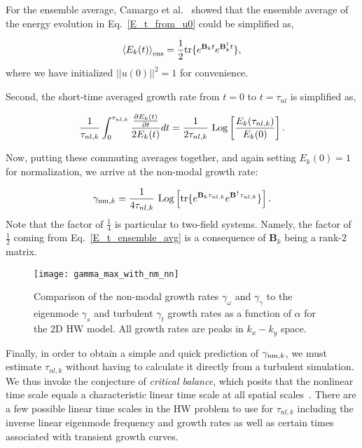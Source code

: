 \documentclass[twocolumn,showkeys,superscriptaddress]{revtex4}
\def\beq{\begin{equation}}
\def\eeq{\end{equation}}
\newcommand{\pdiff}[2]{\frac{\partial#1}{\partial#2}}
\begin{document}
For the ensemble average, Camargo et al.~\cite{camargo1998,friedman2014} showed that the ensemble average of the energy evolution in Eq.~\ref{E_t_from_u0} could be simplified as,

\beq
\label{E_t_ensemble_avg}
\left< E_k(t) \right>_{{\rm{ens}}} = \frac{1}{2} {\rm{tr}} \{ e^{\mathbf{B}_k t} e^{\mathbf{B}_k^{\dagger}t} \},
\eeq
where we have initialized $||u(0)||^2 = 1$ for convenience.

Second, the short-time averaged growth rate from $t=0$ to $t = \tau_{nl}$ is simplified as,

\beq
\label{gamma_nm_calc}
\frac{1}{\tau_{nl,k}} \int_0^{\tau_{nl,k}} \frac{\pdiff{E_k(t)}{t}}{2 E_k(t)} dt = \frac{1}{2 \tau_{nl,k}} \ {\rm{Log}} \left[ \frac{E_k(\tau_{nl,k})}{E_k(0)}\right].
\eeq

Now, putting these commuting averages together, and again setting $E_k(0) = 1$ for normalization, we arrive at the non-modal growth rate:

\beq
\label{gamma_nm}
\gamma_{{\rm{nm}},k} = \frac{1}{4 \tau_{nl,k}} \ {\rm{Log}} \left[ {\rm{tr}} \{ e^{\mathbf{B}_k \tau_{nl,k}} e^{\mathbf{B}^{\dagger} \tau_{nl,k}} \} \right].
\eeq
Note that the factor of $\frac{1}{4}$ is particular to two-field systems. Namely, the factor of $\frac{1}{2}$ coming from Eq.~\ref{E_t_ensemble_avg} is a consequence of $\mathbf{B}_k$ being a rank-$2$ matrix.

\begin{figure}
\centerline{\texttt{[image: gamma\_max\_with\_nm\_nn]}}
\caption{Comparison of the non-modal growth rates $\gamma_{\omega}$ and $\gamma_{\gamma}$ to the eigenmode $\gamma_{s}$ and turbulent $\gamma_{t}$ growth rates as a function of $\alpha$ for the 2D HW model. 
All growth rates are peaks in $k_x-k_y$ space.}
\label{gamma_max_with_nm}
\end{figure}

Finally, in order to obtain a simple and quick prediction of $\gamma_{{\rm{nm}},k}$, we must estimate $\tau_{nl,k}$ without having to calculate it directly from a turbulent simulation. 
We thus invoke the conjecture of \emph{critical balance}, which posits that the nonlinear time scale equals a characteristic linear time scale at all spatial scales~\cite{schekochihin2012}. 
There are a few possible linear time scales in the HW problem to use for $\tau_{nl,k}$ 
including the inverse linear eigenmode frequency and growth rates as well as certain times associated with transient growth curves.
\end{document}

